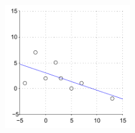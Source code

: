 \documentclass{tufte-handout}
\begin{document}
\begin{fullwidth}
\begin{description}
\begin{figure}[h]
  \includegraphics[width=155pt]{images/handout8_example}%
  \label{fig:fullfig}%
\end{figure}


\end{description}

\end{fullwidth}
\end{document}
